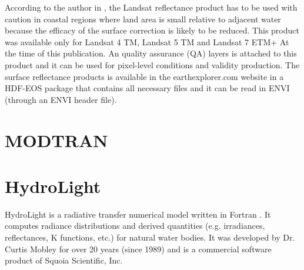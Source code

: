According to the author in \cite{LandsatCDR}, the Landsat reflectance product has to be used with caution in coastal regions where land area is small relative to adjacent water because the efficacy of the surface correction is likely to be reduced. This product was available only for Landsat 4 TM, Landsat 5 TM and Landsat 7 ETM+ At the time of this publication. An quality assurance (QA) layers is attached to this product and it can be used for pixel-level conditions and validity production. The surface reflectance products is available in the earthexplorer.com website in a HDF-EOS package that contains all necessary files and it can be read in ENVI (through an ENVI header file).
\section{MODTRAN}
\section{HydroLight}
HydroLight is a radiative transfer numerical model written in Fortran \cite{MobleHE}. It computes radiance distributions and derived quantities (e.g. irradiances, reflectances, K functions, etc.) for natural water bodies. It was developed by Dr. Curtis Mobley for over 20 years (since 1989) and is a commercial software product of Squoia Scientific, Inc.

